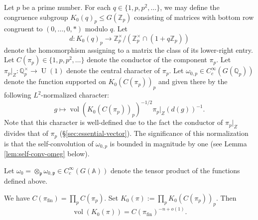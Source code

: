 \documentclass[reqno]{amsart}
\DeclareMathOperator{\U}{U}
\DeclareMathOperator{\fin}{fin}
\DeclareMathOperator{\vol}{vol}
\theoremstyle{plain} \newtheorem{theorem} {Theorem}
\theoremstyle{definition} \newtheorem{definition} [theorem] {Definition}
\theoremstyle{itplain} %
\numberwithin{equation}{section}
\numberwithin{theorem}{section}
\renewcommand{\leq}{\leqslant}
\begin{document}
Let $p$ be a prime number.  For each $q \in \{1, p, p^2, \dotsc\}$, we may define the congruence subgroup $K_0(q)_p \leq G(\mathbb{Z}_p)$ consisting of matrices with bottom row congruent to $(0,\dotsc,0,\ast)$ modulo $q$.  Let
\begin{equation*}
  d : K_0(q)_p \rightarrow \mathbb{Z}_p^\times / (\mathbb{Z}_p^\times \cap (1 + q \mathbb{Z}_p))
\end{equation*}
denote the homomorphism assigning to a matrix the class of its lower-right entry.  Let $C(\pi_p) \in \{1, p, p^2, \dotsc \}$ denote the conductor of the component $\pi_p$.  Let $\pi_p|_{Z} : \mathbb{Q}_p^\times \rightarrow \U(1)$ denote the central character of $\pi_p$.  Let $\omega_{0,p} \in C_c^\infty(G(\mathbb{Q}_p))$ denote the function supported on  $K_0(C(\pi_p))_p$ and given there by the following $L^2$-normalized character:
\begin{equation*}
  g \mapsto \vol(K_0(C(\pi_p))_p)^{-1/2} \pi_p|_{Z}(d(g))^{-1}.
\end{equation*}
Note that this character is well-defined due to the fact the conductor of $\pi_p|_{Z}$ divides that of $\pi_p$ (\S\ref{sec:essential-vector}).  The significance of this normalization is that the self-convolution of $\omega_{0,p}$ is bounded in magnitude by one (see Lemma \ref{lem:self-conv-omeg} below).

Let $\omega_0 = \otimes_{\mathfrak{p}} \omega_{0,\mathfrak{p}} \in C_c^\infty(G(\mathbb{A}))$ denote the tensor product of the functions defined above.

We have $C(\pi_{\fin}) = \prod_p C(\pi_p)$.  Set $K_0(\pi) := \prod_p K_0(C(\pi_p))_p$.  Then
\begin{equation}\label{eq:volk_0pi-=-cpiinfty}
  \vol(K_0(\pi)) = C(\pi_{\fin})^{-n+o(1)}.
\end{equation}
\end{document}
